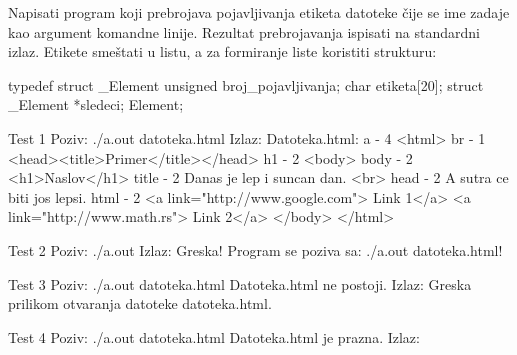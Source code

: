 \begin{Exercise}[label=607]
Napisati program koji prebrojava pojavljivanja etiketa  
datoteke čije se ime zadaje kao argument komandne linije. Rezultat prebrojavanja 
ispisati na standardni izlaz. Etikete smeštati u listu, a za formiranje liste koristiti strukturu:
\begin{ckod} 
 typedef struct _Element
 {
   unsigned broj_pojavljivanja;
   char etiketa[20];
   struct _Element *sledeci;
 } Element;
\end{ckod}
\begin{maxitest}
\begin{test}{Test 1}
Poziv: ./a.out datoteka.html                             Izlaz:  
Datoteka.html:                                             a - 4
<html>                                                     br - 1
  <head><title>Primer</title></head>                       h1 - 2
  <body>                                                   body - 2
    <h1>Naslov</h1>                                        title - 2
    Danas je lep i suncan dan. <br>                        head - 2
    A sutra ce biti jos lepsi.                             html - 2
    <a link="http://www.google.com"> Link 1</a>    
    <a link="http://www.math.rs"> Link 2</a>
  </body>
</html>
\end{test}
\end{maxitest}
\begin{miditest}
\begin{test}{Test 2}
Poziv: ./a.out 
Izlaz: 
  Greska! Program se poziva 
  sa: ./a.out datoteka.html!
\end{test}
\end{miditest}
\begin{miditest}
\begin{test}{Test 3}
Poziv: ./a.out datoteka.html
Datoteka.html ne postoji.
Izlaz: 
  Greska prilikom otvaranja 
  datoteke datoteka.html.
\end{test}
\end{miditest}
\begin{miditest}
\begin{test}{Test 4}
Poziv: ./a.out datoteka.html
Datoteka.html je prazna.
Izlaz: 
\end{test}
\end{miditest}
\end{Exercise}
\begin{Answer}[ref=607]
\end{Answer}

